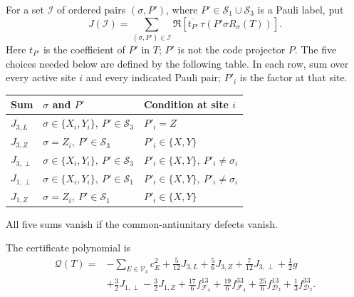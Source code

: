 For a set \(\mathcal I\) of ordered pairs \((\sigma,P')\), where
\(P'\in\mathcal S_1\cup\mathcal S_3\) is a Pauli label, put
\begin{equation}
 J(\mathcal I)=
 \sum_{(\sigma,P')\in\mathcal I}
 \Re\!\left[\overline{t_{P'}}\,
        \tau\!\left(P'\sigma R_\sigma(T)\right)\right].
 \label{o2gc:J-contraction}
\end{equation}
Here \(t_{P'}\) is the coefficient of \(P'\) in \(T\); \(P'\) is not
the code projector \(P\). The five choices needed below are defined
by the following table. In each row, sum over every active site \(i\)
and every indicated Pauli pair; \(P'_i\) is the factor at that site.
\begin{center}
\begin{tabular}{@{}lll@{}}
\toprule
Sum & \(\sigma\) and \(P'\) & Condition at site \(i\)\\
\midrule
\(J_{3,L}\) &
\(\sigma\in\{X_i,Y_i\},\ P'\in\mathcal S_3\) & \(P'_i=Z\)\\
\(J_{3,Z}\) &
\(\sigma=Z_i,\ P'\in\mathcal S_3\) & \(P'_i\in\{X,Y\}\)\\
\(J_{3,\perp}\) &
\(\sigma\in\{X_i,Y_i\},\ P'\in\mathcal S_3\) &
\(P'_i\in\{X,Y\},\ P'_i\ne\sigma_i\)\\
\(J_{1,\perp}\) &
\(\sigma\in\{X_i,Y_i\},\ P'\in\mathcal S_1\) &
\(P'_i\in\{X,Y\},\ P'_i\ne\sigma_i\)\\
\(J_{1,Z}\) &
\(\sigma=Z_i,\ P'\in\mathcal S_1\) & \(P'_i\in\{X,Y\}\)\\
\bottomrule
\end{tabular}
\end{center}
All five sums vanish if the common-antiunitary defects vanish.

The certificate polynomial is
\begin{align}
 \mathcal Q(T)={}&-\sum_{E\in\mathcal V_3}c_E^2
 +\frac5{12}J_{3,L}+\frac56J_{3,Z}
 +\frac7{12}J_{3,\perp}+\frac12g\nonumber\\
 &+\frac32J_{1,\perp}-\frac32J_{1,Z}
 +\frac{17}{6}f_{\mathcal F_4}^{13}
 +\frac{19}{6}f_{\mathcal F_4}^{33}
 +\frac{25}{6}f_{\mathcal D_3}^{13}
 +\frac13f_{\mathcal D_2}^{33}.
 \label{o2gc:Q}
\end{align}

